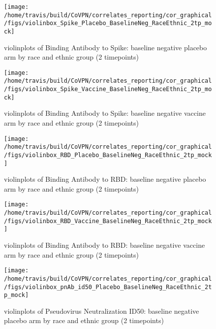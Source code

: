 \documentclass[]{book}
\theoremstyle{definition}
\theoremstyle{definition}
\theoremstyle{definition}
\newcommand{\1}{\mathbbm{1}}
\begin{document}
\clearpage
\begin{figure}[H]

{\centering \texttt{[image: /home/travis/build/CoVPN/correlates\_reporting/cor\_graphical/figs/violinbox\_Spike\_Placebo\_BaselineNeg\_RaceEthnic\_2tp\_mock]} 

}

\caption{violinplots of Binding Antibody to Spike: baseline negative placebo arm by race and ethnic group (2 timepoints)}\label{fig:unnamed-chunk-195}
\end{figure}

\clearpage
\begin{figure}[H]

{\centering \texttt{[image: /home/travis/build/CoVPN/correlates\_reporting/cor\_graphical/figs/violinbox\_Spike\_Vaccine\_BaselineNeg\_RaceEthnic\_2tp\_mock]} 

}

\caption{violinplots of Binding Antibody to Spike: baseline negative vaccine arm by race and ethnic group (2 timepoints)}\label{fig:unnamed-chunk-196}
\end{figure}

\clearpage
\begin{figure}[H]

{\centering \texttt{[image: /home/travis/build/CoVPN/correlates\_reporting/cor\_graphical/figs/violinbox\_RBD\_Placebo\_BaselineNeg\_RaceEthnic\_2tp\_mock]} 

}

\caption{violinplots of Binding Antibody to RBD: baseline negative placebo arm by race and ethnic group (2 timepoints)}\label{fig:unnamed-chunk-197}
\end{figure}

\clearpage
\begin{figure}[H]

{\centering \texttt{[image: /home/travis/build/CoVPN/correlates\_reporting/cor\_graphical/figs/violinbox\_RBD\_Vaccine\_BaselineNeg\_RaceEthnic\_2tp\_mock]} 

}

\caption{violinplots of Binding Antibody to RBD: baseline negative vaccine arm by race and ethnic group (2 timepoints)}\label{fig:unnamed-chunk-198}
\end{figure}

\clearpage
\begin{figure}[H]

{\centering \texttt{[image: /home/travis/build/CoVPN/correlates\_reporting/cor\_graphical/figs/violinbox\_pnAb\_id50\_Placebo\_BaselineNeg\_RaceEthnic\_2tp\_mock]} 

}

\caption{violinplots of Pseudovirus Neutralization ID50: baseline negative placebo arm by race and ethnic group (2 timepoints)}\label{fig:unnamed-chunk-199}
\end{figure}
\end{document}
